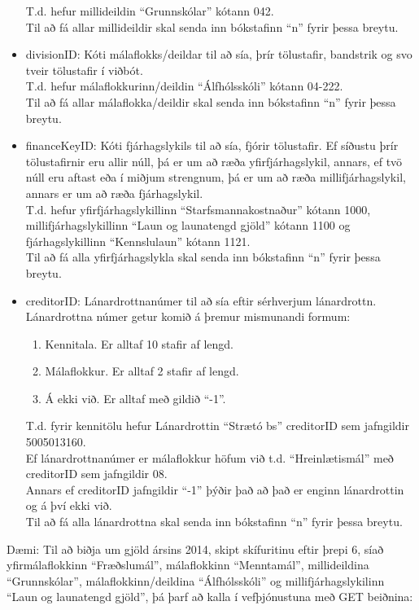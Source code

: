\documentclass{article}
\theoremstyle{blueP}
\theoremstyle{greenS}
\begin{document}
\begin{itemize}
    T.d. hefur millideildin ``Grunnskólar'' kótann 042.\\
    Til að fá allar millideildir skal senda inn bókstafinn ``n'' fyrir þessa breytu.
    \item divisionID: Kóti málaflokks/deildar til að sía, þrír tölustafir, bandstrik og svo tveir tölustafir í viðbót. \\
    T.d. hefur málaflokkurinn/deildin ``Álfhólsskóli'' kótann 04-222.\\
    Til að fá allar málaflokka/deildir skal senda inn bókstafinn ``n'' fyrir þessa breytu.
    \item financeKeyID: Kóti fjárhagslykils til að sía, fjórir tölustafir. Ef síðustu þrír tölustafirnir eru allir núll, þá er um að ræða yfirfjárhagslykil, annars, ef tvö núll eru aftast eða í miðjum strengnum, þá er um að ræða millifjárhagslykil, annars er um að ræða fjárhagslykil. \\
    T.d. hefur yfirfjárhagslykillinn ``Starfsmannakostnaður'' kótann 1000, millifjárhagslykillinn ``Laun og launatengd gjöld'' kótann 1100 og fjárhagslykillinn ``Kennslulaun'' kótann 1121.\\
    Til að fá alla yfirfjárhagslykla skal senda inn bókstafinn ``n'' fyrir þessa breytu.
    \item creditorID: Lánardrottnanúmer til að sía eftir sérhverjum lánardrottn. Lánardrottna númer getur komið á þremur mismunandi formum: 
    \begin{enumerate}[start=1]
        \item Kennitala. Er alltaf 10 stafir af lengd.
        \item Málaflokkur. Er alltaf 2 stafir af lengd. 
        \item Á ekki við. Er alltaf með gildið ``-1''. 
    \end{enumerate}
    T.d. fyrir kennitölu hefur Lánardrottin ``Strætó bs'' creditorID sem jafngildir 5005013160.\\
    Ef lánardrottnanúmer er málaflokkur höfum við t.d. ``Hreinlætismál'' með creditorID sem jafngildir 08. \\
    Annars ef creditorID jafngildir ``-1'' þýðir það að það er enginn lánardrottin og á því ekki við. \\
    Til að fá alla lánardrottna skal senda inn bókstafinn ``n'' fyrir þessa breytu.
\end{itemize}
Dæmi: Til að biðja um gjöld ársins 2014, skipt skífuritinu eftir þrepi 6, síað yfirmálaflokkinn ``Fræðslumál'', málaflokkinn ``Menntamál'', millideildina ``Grunnskólar'', málaflokkinn/deildina ``Álfhólsskóli'' og millifjárhagslykilinn ``Laun og launatengd gjöld'', þá þarf að kalla í vefþjónustuna með GET beiðnina:\\
\end{document}
